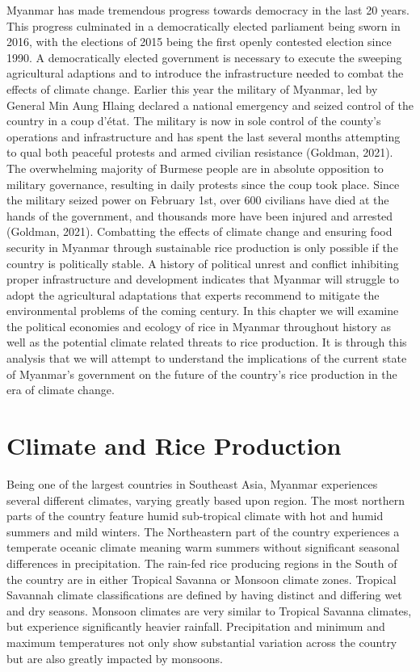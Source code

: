 \documentclass{book}\usepackage{knitr}
\begin{document}
Myanmar has made tremendous progress towards democracy in the last 20 years. This progress culminated in a democratically elected parliament being sworn in 2016, with the elections of 2015 being the first openly contested election since 1990. A democratically elected government is necessary to execute the sweeping agricultural adaptions and to introduce the infrastructure needed to combat the effects of climate change. Earlier this year the military of Myanmar, led by General Min Aung Hlaing declared a national emergency and seized control of the country in a coup d’état. The military is now in sole control of the county’s operations and infrastructure and has spent the last several months attempting to qual both peaceful protests and armed civilian resistance (Goldman, 2021). The overwhelming majority of Burmese people are in absolute opposition to military governance, resulting in daily protests since the coup took place. Since the military seized power on February 1st, over 600 civilians have died at the hands of the government, and thousands more have been injured and arrested (Goldman, 2021). 
Combatting the effects of climate change and ensuring food security in Myanmar through sustainable rice production is only possible if the country is politically stable. A history of political unrest and conflict inhibiting proper infrastructure and development indicates that Myanmar will struggle to adopt the agricultural adaptations that experts recommend to mitigate the environmental problems of the coming century. In this chapter we will examine the political economies and ecology of rice in Myanmar throughout history as well as the potential climate related threats to rice production. It is through this analysis that we will attempt to understand the implications of the current state of Myanmar’s government on the future of the country’s rice production in the era of climate change. 

\section{Climate and Rice Production}
Being one of the largest countries in Southeast Asia, Myanmar experiences several different climates, varying greatly based upon region. The most northern parts of the country feature humid sub-tropical climate with hot and humid summers and mild winters. The Northeastern part of the country experiences a temperate oceanic climate meaning warm summers without significant seasonal differences in precipitation. The rain-fed rice producing regions in the South of the country are in either Tropical Savanna or Monsoon climate zones. Tropical Savannah climate classifications are defined by having distinct and differing wet and dry seasons. Monsoon climates are very similar to Tropical Savanna climates, but experience significantly heavier rainfall. Precipitation and minimum and maximum temperatures not only show substantial variation across the country but are also greatly impacted by monsoons. 
\end{document}
